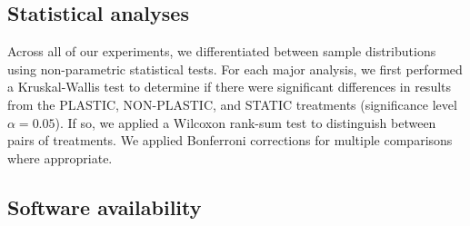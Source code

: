 \documentclass[utf8]{frontiersSCNS} %
\providecommand{\DIFaddend}{} %
\DeclareRobustCommand{\DIFaddend}{\DIFOaddend \let\includegraphics\DIFOincludegraphics} %
\begin{document}
\begin{raggedbottom}
\DIFaddend %


\subsection{Statistical analyses}

Across all of our experiments, we differentiated between sample distributions using non-parametric statistical tests.
For each major analysis, we first performed a Kruskal-Wallis test \citep{kruskal_use_1952} to
determine if there were significant differences in results from the PLASTIC, NON-PLASTIC, and STATIC treatments (significance level $\alpha=0.05$).
If so, we applied a Wilcoxon rank-sum test \citep{kotz_individual_1992} to distinguish between pairs of treatments.
We applied Bonferroni corrections for multiple comparisons \citep{rice_analyzing_1989} where appropriate.

\subsection{Software availability}


\end{raggedbottom}
\end{document}
